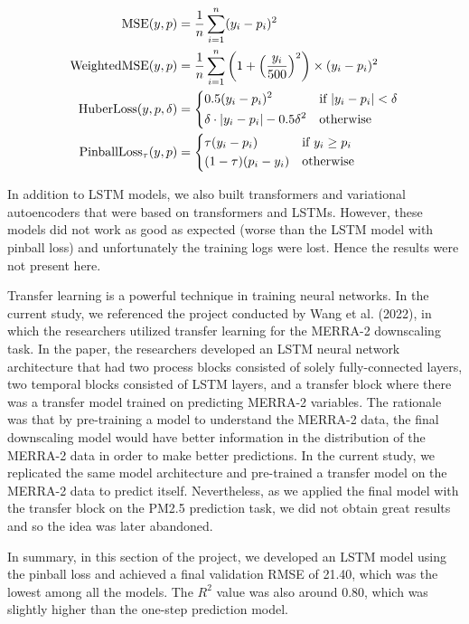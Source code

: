 \documentclass[draft]{agujournal2019}
\begin{document}
\begin{align*}
    \text{MSE}(y, p) &= \frac{1}{n} \sum_{i=1}^{n} (y_i - p_i)^2 \\
    \text{WeightedMSE}(y, p) &= \frac{1}{n} \sum_{i=1}^{n} \left( 1 + \left( \frac{y_i}{500} \right)^2 \right) \times (y_i - p_i)^2 \\
    \text{HuberLoss}(y, p, \delta) &= \begin{dcases}
        0.5(y_i - p_i)^2 & \text{if } |y_i - p_i| < \delta \\
        \delta \cdot |y_i - p_i| - 0.5\delta^2 & \text{otherwise}
    \end{dcases} \\
        \text{PinballLoss}_\tau(y, p) &= \begin{dcases}
            \tau(y_i - p_i) & \text{if } y_i \geq p_i \\
            (1 - \tau)(p_i - y_i) & \text{otherwise}
        \end{dcases}
\end{align*}

In addition to LSTM models, we also built transformers and variational autoencoders that were based on transformers and LSTMs. However, these models did not work as good as expected (worse than the LSTM model with pinball loss) and unfortunately the training logs were lost. Hence the results were not present here.

Transfer learning is a powerful technique in training neural networks. In the current study, we referenced the project conducted by Wang et al. (2022), in which the researchers utilized transfer learning for the MERRA-2 downscaling task. In the paper, the researchers developed an LSTM neural network architecture that had two process blocks consisted of solely fully-connected layers, two temporal blocks consisted of LSTM layers, and a transfer block where there was a transfer model trained on predicting MERRA-2 variables. The rationale was that by pre-training a model to understand the MERRA-2 data, the final downscaling model would have better information in the distribution of the MERRA-2 data in order to make better predictions. In the current study, we replicated the same model architecture and pre-trained a transfer model on the MERRA-2 data to predict itself. Nevertheless, as we applied the final model with the transfer block on the PM2.5 prediction task, we did not obtain great results and so the idea was later abandoned.

In summary, in this section of the project, we developed an LSTM model using the pinball loss and achieved a final validation RMSE of 21.40, which was the lowest among all the models. The \( R^2 \) value was also around 0.80, which was slightly higher than the one-step prediction model.
\end{document}
